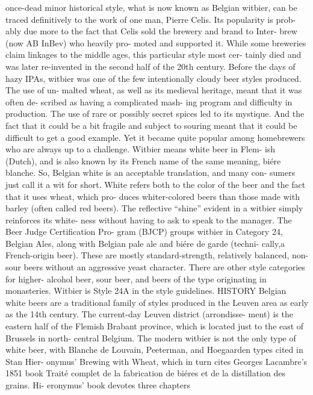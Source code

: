\documentclass[a4paper,parskip=half]{scrartcl}
\begin{document}
\parencite[24]{Strong2021}
once-dead minor historical
style, what is now known as
Belgian witbier, can be traced
definitively to the work of one
man, Pierre Celis. Its popularity is prob-
ably due more to the fact that Celis
sold the brewery and brand to Inter-
brew (now AB InBev) who heavily pro-
moted and supported it. While some
breweries claim linkages to the middle
ages, this particular style most cer-
tainly died and was later re-invented in
the second half of the 20th century.
Before the days of hazy IPAs, witbier
was one of the few intentionally cloudy
beer styles produced. The use of un-
malted wheat, as well as its medieval
heritage, meant that it was often de-
scribed as having a complicated mash-
ing program and difficulty in production.
The use of rare or possibly secret spices
led to its mystique. And the fact that
it could be a bit fragile and subject to
souring meant that it could be difficult
to get a good example. Yet it became
quite popular among homebrewers who
are always up to a challenge.
Witbier means white beer in Flem-
ish (Dutch), and is also known by its
French name of the same meaning,
biére blanche. So, Belgian white is an
acceptable translation, and many con-
sumers just call it a wit for short. White
refers both to the color of the beer and
the fact that it uses wheat, which pro-
duces whiter-colored beers than those
made with barley (often called red
beers). The reflective “shine” evident in
a witbier simply reinforces its white-
ness without having to ask to speak to
the manager.
The Beer Judge Certification Pro-
gram (BJCP) groups witbier in Category
24, Belgian Ales, along with Belgian
pale ale and biére de garde (techni-
cally,a French-origin beer). These are
mostly standard-strength, relatively
balanced, non-sour beers without an
aggressive yeast character. There are
other style categories for higher-
alcohol beer, sour beer, and beers of the
type originating in monasteries. Witbier
is Style 24A in the style guidelines.
HISTORY
Belgian white beers are a traditional
family of styles produced in the Leuven
area as early as the 14th century. The
current-day Leuven district (arrondisse-
ment) is the eastern half of the Flemish
Brabant province, which is located just
to the east of Brussels in north-
central Belgium. The modern witbier
is not the only type of white beer, with
Blanche de Louvain, Peeterman, and
Hoegaarden types cited in Stan Hier-
onymus’ Brewing with Wheat, which in
turn cites Georges Lacambre’s 1851
book Traité complet de la fabrication de
biéres et de la distillation des grains. Hi-
eronymus’ book devotes three chapters
\end{document}
